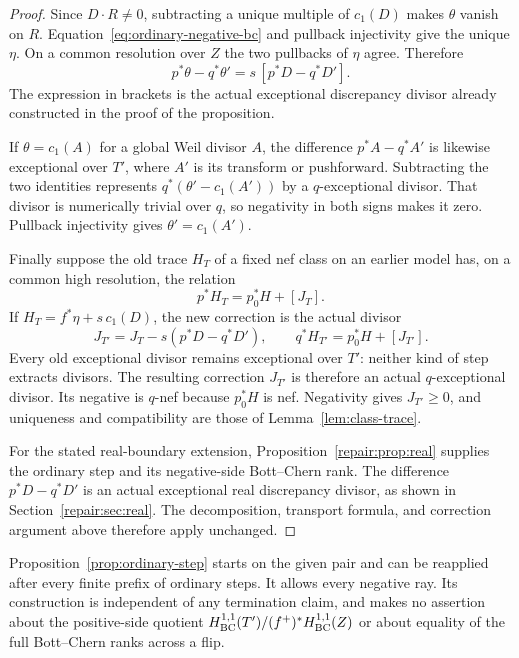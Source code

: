 \begin{proof}
Since $D\cdot R\ne0$, subtracting a unique multiple of $c_1(D)$ makes
$\theta$ vanish on $R$.  Equation~\eqref{eq:ordinary-negative-bc} and
pullback injectivity give the unique $\eta$.  On a common resolution
over $Z$ the two pullbacks of $\eta$ agree.  Therefore
\[
 p^*\theta-q^*\theta'
       =s\,[p^*D-q^*D'].
\]
The expression in brackets is the actual exceptional discrepancy
divisor already constructed in the proof of the proposition.

If $\theta=c_1(A)$ for a global Weil divisor $A$, the difference
$p^*A-q^*A'$ is likewise exceptional over $T'$, where $A'$ is its
transform or pushforward.  Subtracting the two identities represents
$q^*(\theta'-c_1(A'))$ by a $q$-exceptional divisor.  That divisor is
numerically trivial over $q$, so negativity in both signs makes it
zero.  Pullback injectivity gives $\theta'=c_1(A')$.

Finally suppose the old trace $H_T$ of a fixed nef class on an earlier
model has, on a common high resolution, the relation
\[
 p^*H_T=p_0^*H+[J_T].
\]
If $H_T=f^*\eta+s\,c_1(D)$, the new correction is the actual divisor
\[
 J_{T'}=J_T-s(p^*D-q^*D'),\qquad
 q^*H_{T'}=p_0^*H+[J_{T'}].
\]
Every old exceptional divisor remains exceptional
over $T'$: neither kind of step extracts divisors.  The resulting
correction $J_{T'}$ is therefore an actual $q$-exceptional divisor.
Its negative is $q$-nef because $p_0^*H$ is nef.  Negativity gives
$J_{T'}\geq0$, and uniqueness and compatibility are those of
Lemma~\ref{lem:class-trace}.

For the stated real-boundary extension,
Proposition~\ref{repair:prop:real} supplies the ordinary step and its
negative-side Bott--Chern rank. The difference $p^*D-q^*D'$ is an actual
exceptional real discrepancy divisor, as shown in
Section~\ref{repair:sec:real}. The decomposition, transport formula,
and correction argument above therefore apply unchanged.
\end{proof}

\begin{remark}\label{rem:ordinary-continuation}
Proposition~\ref{prop:ordinary-step} starts on the given pair and can be
reapplied after every finite prefix of ordinary steps.  It allows every
negative ray.  Its construction is independent of any termination
claim, and makes no assertion about the positive-side quotient
$H^{1,1}_{\mathrm{BC}}(T')/(f^+)^*H^{1,1}_{\mathrm{BC}}(Z)$ or about equality of the full Bott--Chern ranks
across a flip.
\end{remark}
